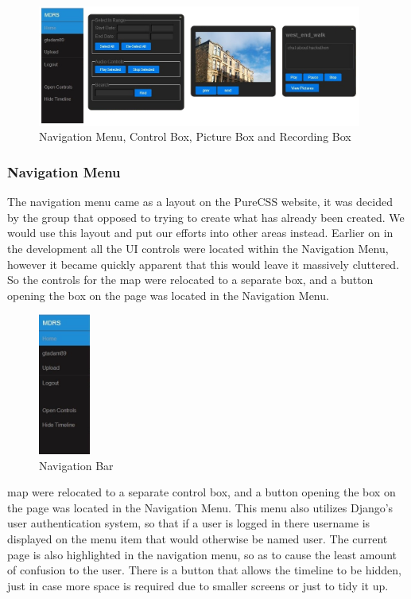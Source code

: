 \documentclass{l3proj}
\begin{document}
\begin{figure}[ht!]
\centering
\includegraphics[width=0.95\textwidth]{images/ui-elements.jpg}
\caption{Navigation Menu, Control Box, Picture Box and Recording Box}
\end{figure}

\subsubsection{Navigation Menu}

The navigation menu came as a layout on the PureCSS website, it was decided by the group that opposed to trying to create what has already been created. We would use this layout and put our efforts into other areas instead. Earlier on in the development all the UI controls were located within the Navigation Menu, however it became quickly apparent that this would leave it massively cluttered. So the controls for the map were relocated to a separate box, and a button opening the box on the page was located in the Navigation Menu.

\begin{figure}[ht!]
\centering
\includegraphics[width=0.15\textwidth]{images/nav-bar.jpg}
\caption{Navigation Bar}
\end{figure}

map were relocated to a separate control box, and a button opening the box on the page was located in the Navigation Menu. This menu also utilizes Django's user authentication system, so that if a user is logged in there username is displayed on the menu item that would otherwise be named user. The current page is also highlighted in the navigation menu, so as to cause the least amount of confusion to the user. There is a button that allows the timeline to be hidden, just in case more space is required due to smaller screens or just to tidy it up.
\end{document}
